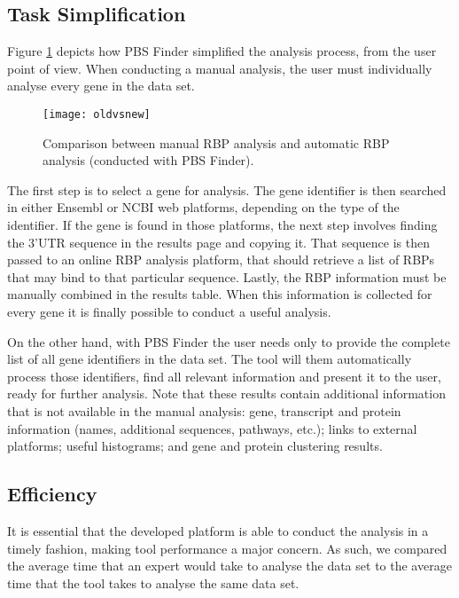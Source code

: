 \subsection{Task Simplification}

Figure \ref{fig:oldvsnew} depicts how PBS Finder simplified the analysis process,
from the user point of view. When conducting a manual analysis, the user must
individually analyse every gene in the data set.

\begin{figure}[!htb]
  \begin{center}
    \leavevmode
    \texttt{[image: oldvsnew]}
    \caption[Comparison between manual RBP analysis and automatic RBP analysis (conducted with PBS Finder)]{
      Comparison between manual RBP analysis and automatic RBP analysis
      (conducted with PBS Finder).
    }
    \label{fig:oldvsnew}
  \end{center}
\end{figure}

The first step is to select a gene for analysis. The gene identifier is then
searched in either Ensembl or NCBI web platforms, depending on the type of the
identifier. If the gene is found in those platforms, the next step involves
finding the 3'UTR sequence in the results page and copying it. That sequence is
then passed to an online RBP analysis platform, that should retrieve a list of
RBPs that may bind to that particular sequence. Lastly, the RBP information must
be manually combined in the results table. When this information is collected
for every gene it is finally possible to conduct a useful analysis.

On the other hand, with PBS Finder the user needs only to provide the complete
list of all gene identifiers in the data set. The tool will them automatically
process those identifiers, find all relevant information and present it to the
user, ready for further analysis. Note that these results contain additional
information that is not available in the manual analysis: gene, transcript and
protein information (names, additional sequences, pathways, etc.); links to
external platforms; useful histograms; and gene and protein clustering results.

\subsection{Efficiency}

It is essential that the developed platform is able to conduct the analysis in a
timely fashion, making tool performance a major concern. As such, we compared
the average time that an expert would take to analyse the data set to the
average time that the tool takes to analyse the same data set.

